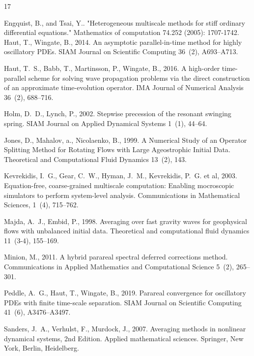 \documentclass[a4,12pt]{article}
\renewenvironment{thebibliography}[1]{%
    \begin{oldthebibliography}{#1}%
    \setlength{\parskip}{0ex}%
    \setlength{\itemsep}{0ex}%
}%
                 {%
  \end{oldthebibliography}%
                 }
\begin{document}
\begin{thebibliography}{17}
Engquist, B., and Tsai, Y.. "Heterogeneous multiscale methods for stiff ordinary differential equations." Mathematics of computation 74.252 (2005): 1707-1742.
Haut, T., Wingate, B., 2014. An asymptotic parallel-in-time method for highly
  oscillatory {PDE}s. SIAM Journal on Scientific Computing 36~(2), A693--A713.

Haut, T.~S., Babb, T., Martinsson, P., Wingate, B., 2016. A high-order
  time-parallel scheme for solving wave propagation problems via the direct
  construction of an approximate time-evolution operator. IMA Journal of
  Numerical Analysis 36~(2), 688--716.

Holm, D.~D., Lynch, P., 2002. Stepwise precession of the resonant swinging
  spring. SIAM Journal on Applied Dynamical Systems 1~(1), 44--64.

Jones, D., Mahalov, a., Nicolaenko, B., 1999. {A Numerical Study of an Operator
  Splitting Method for Rotating Flows with Large Ageostrophic Initial Data}.
Theoretical and Computational Fluid Dynamics 13~(2), 143.

  Kevrekidis, I.~G., Gear, C.~W., Hyman, J.~M., Kevrekidis, P.~G. et al,
  2003. {Equation-free, coarse-grained multiscale computation: Enabling mocroscopic simulators to perform system-level analysis}. Communications in Mathematical Sciences, 1~(4), 715--762.

Majda, A.~J., Embid, P., 1998. Averaging over fast gravity waves for
  geophysical flows with unbalanced initial data. Theoretical and computational
  fluid dynamics 11~(3-4), 155--169.

Minion, M., 2011. A hybrid parareal spectral deferred corrections method.
  Communications in Applied Mathematics and Computational Science 5~(2),
  265--301.

Peddle, A.~G., Haut, T., Wingate, B., 2019. Parareal convergence for
  oscillatory {PDE}s with finite time-scale separation. SIAM Journal on
  Scientific Computing 41~(6), A3476--A3497.

Sanders, J.~A., Verhulst, F., Murdock, J., 2007. Averaging methods in nonlinear
  dynamical systems, 2nd Edition. Applied mathematical sciences. Springer, New
  York, Berlin, Heidelberg.


\end{thebibliography}
\end{document}
